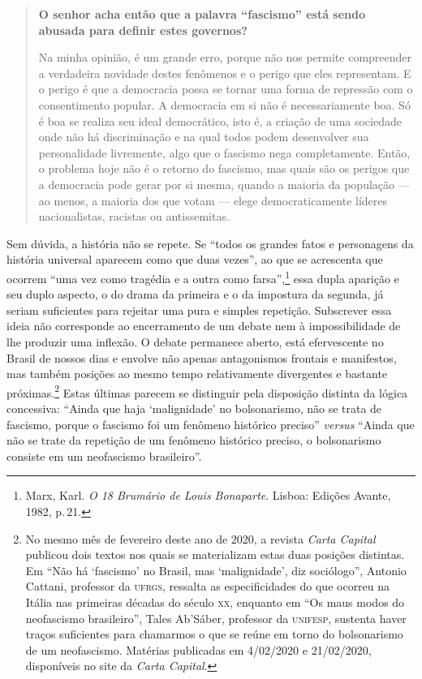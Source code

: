 \begin{quote}
\medskip

\noindent\textbf{O senhor acha então que a palavra ``fascismo'' está sendo
abusada para definir estes governos?}

Na minha opinião, é um grande erro, porque não nos
permite compreender a verdadeira novidade destes fenômenos e o perigo
que eles representam. E o perigo é que a democracia possa se tornar uma
forma de repressão com o consentimento popular. A democracia em si não é
necessariamente boa. Só é boa se realiza seu ideal democrático, isto é,
a criação de uma sociedade onde não há discriminação e na qual todos
podem desenvolver sua personalidade livremente, algo que o fascismo nega
completamente. Então, o problema hoje não é o retorno do fascismo, mas
quais são os perigos que a democracia pode gerar por si mesma, quando a
maioria da população --- ao menos, a maioria dos que votam --- elege
democraticamente líderes nacionalistas, racistas ou antissemitas.
\end{quote}

Sem dúvida, a história não se repete. Se ``todos os grandes fatos e
personagens da história universal aparecem como que duas vezes'', ao que
se acrescenta que ocorrem ``uma vez como tragédia e a outra como
farsa'',\footnote{Marx, Karl. \emph{O 18 Brumário de Louis Bonaparte}.
  Lisboa: Edições Avante, 1982, p.\,21.} essa dupla aparição e seu duplo
aspecto, o do drama da primeira e o da impostura da segunda, já seriam
suficientes para rejeitar uma pura e simples repetição. Subscrever essa
ideia não corresponde ao encerramento de um debate nem à impossibilidade
de lhe produzir uma inflexão. O debate permanece aberto, está
efervescente no Brasil de nossos dias e envolve não apenas antagonismos
frontais e manifestos, mas também posições ao mesmo tempo relativamente
divergentes e bastante próximas.\footnote{No mesmo mês de fevereiro deste
  ano de 2020, a revista \emph{Carta Capital} publicou dois textos nos
  quais se materializam estas duas posições distintas. Em ``Não há
  `fascismo' no Brasil, mas `malignidade', diz sociólogo'', Antonio
  Cattani, professor da \textsc{ufrgs}, ressalta as especificidades do que
  ocorreu na Itália nas primeiras décadas do século \textsc{xx}, enquanto em ``Os
  maus modos do neofascismo brasileiro'', Tales Ab'Sáber, professor da
  \textsc{unifesp}, sustenta haver traços suficientes para chamarmos o que se
  reúne em torno do bolsonarismo de um neofascismo.
  Matérias publicadas em 4/02/2020 e 21/02/2020, disponíveis no site da \textit{Carta Capital}.}
Estas últimas parecem se distinguir pela disposição distinta da lógica
concessiva: ``Ainda que haja `malignidade' no bolsonarismo, não se trata
de fascismo, porque o fascismo foi um fenômeno histórico preciso''
\emph{versus} ``Ainda que não se trate da repetição de um fenômeno
histórico preciso, o bolsonarismo consiste em um neofascismo
brasileiro''.

